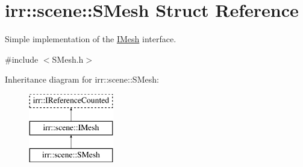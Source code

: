 \hypertarget{structirr_1_1scene_1_1SMesh}{}\section{irr\+:\+:scene\+:\+:S\+Mesh Struct Reference}
\label{structirr_1_1scene_1_1SMesh}


Simple implementation of the \hyperlink{classirr_1_1scene_1_1IMesh}{I\+Mesh} interface.  




{\ttfamily \#include $<$S\+Mesh.\+h$>$}

Inheritance diagram for irr\+:\+:scene\+:\+:S\+Mesh\+:\begin{figure}[H]
\begin{center}
\leavevmode
\includegraphics[height=3.000000cm]{structirr_1_1scene_1_1SMesh}
\end{center}
\end{figure}
